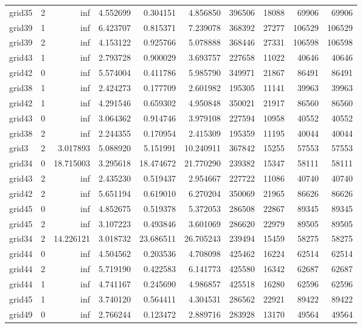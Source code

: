 \begin{longtable}{|l|r|r|r|r|r|r|r|r|r|}
grid35 & 2 & inf & 4.552699 & 0.304151 & 4.856850 & 396506 & 18088 & 69906 & 69906 \\
grid39 & 1 & inf & 6.423707 & 0.815371 & 7.239078 & 368392 & 27277 & 106529 & 106529 \\
grid39 & 2 & inf & 4.153122 & 0.925766 & 5.078888 & 368446 & 27331 & 106598 & 106598 \\
grid43 & 1 & inf & 2.793728 & 0.900029 & 3.693757 & 227658 & 11022 & 40646 & 40646 \\
grid42 & 0 & inf & 5.574004 & 0.411786 & 5.985790 & 349971 & 21867 & 86491 & 86491 \\
grid38 & 1 & inf & 2.424273 & 0.177709 & 2.601982 & 195305 & 11141 & 39963 & 39963 \\
grid42 & 1 & inf & 4.291546 & 0.659302 & 4.950848 & 350021 & 21917 & 86560 & 86560 \\
grid43 & 0 & inf & 3.064362 & 0.914746 & 3.979108 & 227594 & 10958 & 40552 & 40552 \\
grid38 & 2 & inf & 2.244355 & 0.170954 & 2.415309 & 195359 & 11195 & 40044 & 40044 \\
grid3 & 2 & 3.017893 & 5.088920 & 5.151991 & 10.240911 & 367842 & 15255 & 57553 & 57553 \\
grid34 & 0 & 18.715003 & 3.295618 & 18.474672 & 21.770290 & 239382 & 15347 & 58111 & 58111 \\
grid43 & 2 & inf & 2.435230 & 0.519437 & 2.954667 & 227722 & 11086 & 40740 & 40740 \\
grid42 & 2 & inf & 5.651194 & 0.619010 & 6.270204 & 350069 & 21965 & 86626 & 86626 \\
grid45 & 0 & inf & 4.852675 & 0.519378 & 5.372053 & 286508 & 22867 & 89345 & 89345 \\
grid45 & 2 & inf & 3.107223 & 0.493846 & 3.601069 & 286620 & 22979 & 89505 & 89505 \\
grid34 & 2 & 14.226121 & 3.018732 & 23.686511 & 26.705243 & 239494 & 15459 & 58275 & 58275 \\
grid44 & 0 & inf & 4.504562 & 0.203536 & 4.708098 & 425462 & 16224 & 62514 & 62514 \\
grid44 & 2 & inf & 5.719190 & 0.422583 & 6.141773 & 425580 & 16342 & 62687 & 62687 \\
grid44 & 1 & inf & 4.741167 & 0.245690 & 4.986857 & 425518 & 16280 & 62596 & 62596 \\
grid45 & 1 & inf & 3.740120 & 0.564411 & 4.304531 & 286562 & 22921 & 89422 & 89422 \\
grid49 & 0 & inf & 2.766244 & 0.123472 & 2.889716 & 283928 & 13170 & 49564 & 49564 \\

\end{longtable}
